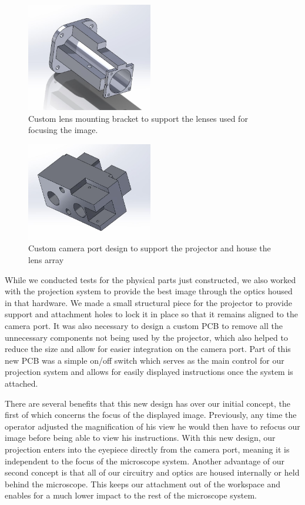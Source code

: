 \documentclass[12pt,a4paper]{article}
\begin{document}
\begin{appendices}
\begin{figure}[h!]
	\centering
	\includegraphics[width = 0.49\textwidth]{pics/lens_housing.jpg}
	\caption[Lens Housing Model]{\centering Custom lens mounting bracket to support the lenses used for focusing the image.}
	\label{LHM}
\end{figure}
\vfill
\begin{figure}[h!]
	\centering
	\includegraphics[width = 0.49\textwidth]{pics/camera_port.jpg}
	\caption[Camera Port Model]{\centering Custom camera port design to support the projector and house the lens array}
	\label{CPM}
\end{figure}

While we conducted tests for the physical parts just constructed, we also worked with the projection system to provide the best image through the optics housed in that hardware.  We made a small structural piece for the projector to provide support and attachment holes to lock it in place so that it remains aligned to the camera port. It was also necessary to design a custom PCB to remove all the unnecessary components not being used by the projector, which also helped to reduce the size and allow for easier integration on the camera port.  Part of this new PCB was a simple on/off switch which serves as the main control for our projection system and allows for easily displayed instructions once the system is attached.

There are several benefits that this new design has over our initial concept, the first of which concerns the focus of the displayed image.  Previously, any time the operator adjusted the magnification of his view he would then have to refocus our image before being able to view his instructions.  With this new design, our projection enters into the eyepiece directly from the camera port, meaning it is independent to the focus of the microscope system. Another advantage of our second concept is that all of our circuitry and optics are housed internally or held behind the microscope.  This keeps our attachment out of the workspace and enables for a much lower impact to the rest of the microscope system.


\end{appendices}
\end{document}
